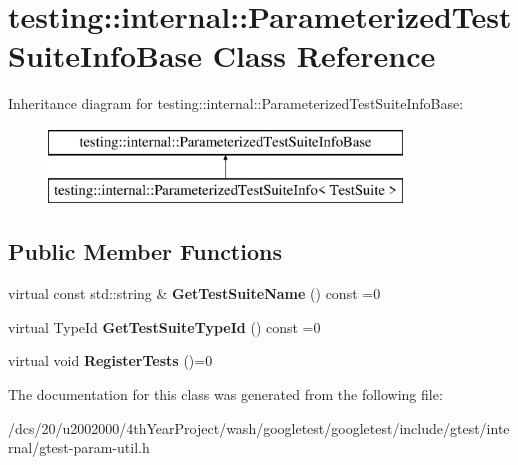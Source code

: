 \hypertarget{classtesting_1_1internal_1_1ParameterizedTestSuiteInfoBase}{}\section{testing\+:\+:internal\+:\+:Parameterized\+Test\+Suite\+Info\+Base Class Reference}
\label{classtesting_1_1internal_1_1ParameterizedTestSuiteInfoBase}
Inheritance diagram for testing\+:\+:internal\+:\+:Parameterized\+Test\+Suite\+Info\+Base\+:\begin{figure}[H]
\begin{center}
\leavevmode
\includegraphics[height=2.000000cm]{classtesting_1_1internal_1_1ParameterizedTestSuiteInfoBase}
\end{center}
\end{figure}
\subsection*{Public Member Functions}
\begin{DoxyCompactItemize}
\item 
\mbox{\label{classtesting_1_1internal_1_1ParameterizedTestSuiteInfoBase_aa6e36241431dc72c251ecee9b637b4d3}} 
virtual const std\+::string \& {\bfseries Get\+Test\+Suite\+Name} () const =0
\item 
\mbox{\label{classtesting_1_1internal_1_1ParameterizedTestSuiteInfoBase_ac5bcbf8c50a44472d697e0c80b54387d}} 
virtual Type\+Id {\bfseries Get\+Test\+Suite\+Type\+Id} () const =0
\item 
\mbox{\label{classtesting_1_1internal_1_1ParameterizedTestSuiteInfoBase_a41d7d663014af0c1e614c5a61293cb5a}} 
virtual void {\bfseries Register\+Tests} ()=0
\end{DoxyCompactItemize}


The documentation for this class was generated from the following file\+:\begin{DoxyCompactItemize}
\item 
/dcs/20/u2002000/4th\+Year\+Project/wash/googletest/googletest/include/gtest/internal/gtest-\/param-\/util.\+h\end{DoxyCompactItemize}
